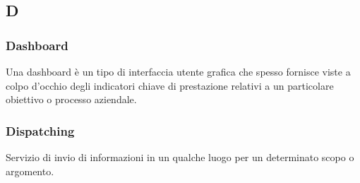 \subsection*{\textbf{\hfill \Huge{D} \hfill}} 
\subsubsection*{Dashboard}
Una dashboard è un tipo di interfaccia utente grafica che spesso fornisce viste a colpo d'occhio degli indicatori chiave di prestazione relativi a un particolare obiettivo o processo aziendale.

\subsubsection*{Dispatching}
Servizio di invio di informazioni in un qualche luogo per un determinato scopo o argomento.